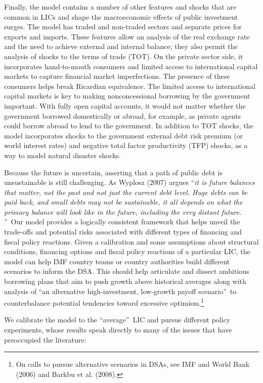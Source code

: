 \documentclass[11pt]{article}
\begin{document}
Finally, the model contains a number of other features and shocks that are
common in LICs and shape the macroeconomic effects of public investment
surges. The model has traded and non-traded sectors and separate prices for
exports and imports. These features allow an analysis of the real exchange
rate and the need to achieve external and internal balance; they also permit
the analysis of shocks to the terms of trade (TOT). On the private sector
side, it incorporates hand-to-mouth consumers and limited access to
international capital markets to capture financial market imperfections. The
presence of these consumers helps break Ricardian equivalence. The limited
access to international capital markets is key to making nonconcessional
borrowing by the government important. With fully open capital accounts, it
would not matter whether the government borrowed domestically or abroad, for
example, as private agents could borrow abroad to lend to the government. In
addition to TOT shocks, the model incorporates shocks to the government
external debt risk premium (or world interest rates) and negative total
factor productivity (TFP) shocks, as a way to model natural disaster shocks.

Because the future is uncertain, asserting that a path of public debt is
unsustainable is still challenging. As Wyplosz (2007) argues
\textquotedblleft \textit{it is future balances that matter, not the past
and not just the current debt level. Huge debts can be paid back, and small
debts may not be sustainable, it all depends on what the primary balance
will look like in the future, including the very distant future.}%
\textquotedblright\ Our model provides a logically consistent framework that
helps unveil the trade-offs and potential risks associated with different
types of financing and fiscal policy reactions. Given a calibration and some
assumptions about structural conditions, financing options and fiscal policy
reactions of a particular LIC, the model can help IMF country teams or
country authorities build different scenarios to inform the DSA. This should
help articulate and dissect ambitious borrowing plans that aim to push
growth above historical averages along with analysis of \textquotedblleft an
alternative high-investment, low-growth payoff scenario\textquotedblright\
to counterbalance potential tendencies toward excessive optimism.\footnote{%
On calls to pursue alternative scenarios in DSAs, see IMF and World Bank
(2006) and Barkbu et al. (2008).}

We calibrate the model to the \textquotedblleft average\textquotedblright\
LIC and pursue different policy experiments, whose results speak directly to
many of the issues that have preoccupied the literature:
\end{document}
